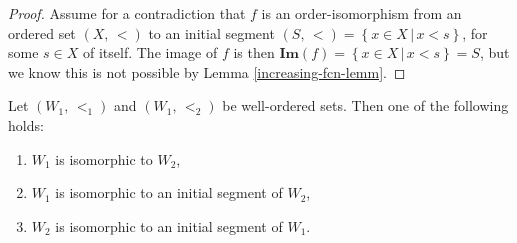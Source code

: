 \documentclass[../../main.tex]{subfiles}
\begin{document}
\begin{proof}
    Assume for a contradiction that $f$ is an order-isomorphism from an ordered set $\left(X,\, <\right)$ to an initial segment $\left(S,\, <\right) = \left\{x \in X \,\vert\, x < s\right\}$, for some $s \in X$ of itself.
    The image of $f$ is then $\mathbf{Im}\left(f\right) = \left\{x \in X \,\vert\, x < s\right\} = S$, but we know this is not possible by Lemma \ref{increasing-fcn-lemm}. 
\end{proof}

\begin{theorem}\label{well-order-isomorphism}\cite[Theorem 1]{Jec78}
    Let $(W_1,\, <_1)$ and $(W_1,\, <_2)$ be well-ordered sets.
    Then one of the following holds:
    \begin{enumerate}
        \item $W_1$ is isomorphic to $W_2$,
        \item $W_1$ is isomorphic to an initial segment of $W_2$,
        \item $W_2$ is isomorphic to an initial segment of $W_1$.
    \end{enumerate}
\end{theorem}
\end{document}
